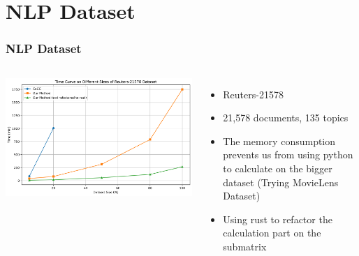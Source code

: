 \documentclass{beamer}
\begin{document}
\section{NLP Dataset}
\begin{frame}
    \frametitle{NLP Dataset}
    \begin{columns}
        \includegraphics[width=1.1\textwidth]{time_curve.png}
        \begin{itemize}
            \item Reuters-21578
            \item 21,578 documents, 135 topics
            \item The memory consumption prevents us from using python to calculate on the bigger dataset (Trying MovieLens Dataset)
            \item Using rust to refactor the calculation part on the submatrix
        \end{itemize}
    \end{columns}
\end{frame}
\end{document}
